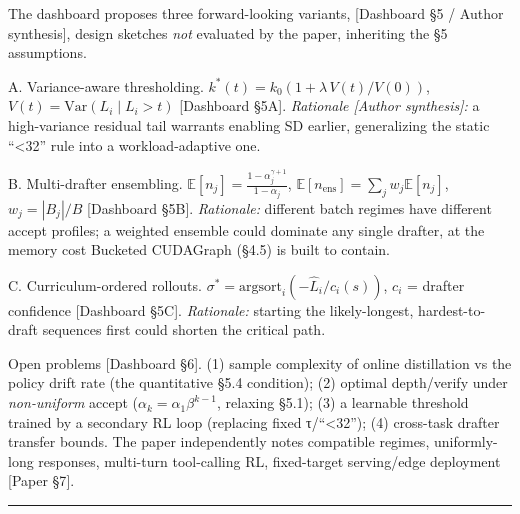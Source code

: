 \documentclass[
  11pt,
  letterpaper,
]{article}
\begin{document}
The dashboard proposes three forward-looking variants, {[}Dashboard §5 /
Author synthesis{]}, design sketches \emph{not} evaluated by the paper,
inheriting the §5 assumptions.

A. Variance-aware thresholding. \(k^*(t)=k_0(1+\lambda\,V(t)/V(0))\),
\(V(t)=\mathrm{Var}(L_i\mid L_i>t)\) {[}Dashboard §5A{]}.
\emph{Rationale {[}Author synthesis{]}:} a high-variance residual tail
warrants enabling SD earlier, generalizing the static ``\textless32''
rule into a workload-adaptive one.

B. Multi-drafter ensembling.
\(\mathbb{E}[n_j]=\frac{1-\alpha_j^{\gamma+1}}{1-\alpha_j}\),
\(\mathbb{E}[n_{\text{ens}}]=\sum_{j} w_j\mathbb{E}[n_j]\),
\(w_j=|B_j|/B\) {[}Dashboard §5B{]}. \emph{Rationale:} different batch
regimes have different accept profiles; a weighted ensemble could
dominate any single drafter, at the memory cost Bucketed CUDAGraph
(§4.5) is built to contain.

C. Curriculum-ordered rollouts.
\(\sigma^*=\mathrm{argsort}_i(-\hat L_i/c_i(s))\), \(c_i\) = drafter
confidence {[}Dashboard §5C{]}. \emph{Rationale:} starting the
likely-longest, hardest-to-draft sequences first could shorten the
critical path.

Open problems {[}Dashboard §6{]}. (1) sample complexity of online
distillation vs the policy drift rate (the quantitative §5.4 condition);
(2) optimal depth/verify under \emph{non-uniform} accept
(\(\alpha_k=\alpha_1\beta^{k-1}\), relaxing §5.1); (3) a learnable
threshold trained by a secondary RL loop (replacing fixed
τ/``\textless32''); (4) cross-task drafter transfer bounds. The paper
independently notes compatible regimes, uniformly-long responses,
multi-turn tool-calling RL, fixed-target serving/edge deployment
{[}Paper §7{]}.

\begin{center}\rule{0.5\linewidth}{0.5pt}\end{center}
\end{document}
